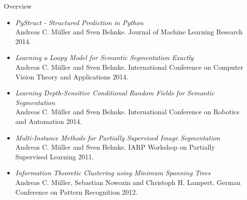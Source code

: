 \documentclass[final,ignorenonframetext,compress]{beamer}
\begin{document}
\begin{frame}{Overview}
    \tiny
\begin{itemize}
    \item
        \emph{PyStruct - Structured Prediction in Python}\\
        Andreas C. M\"uller and Sven Behnke. Journal of Machine Learning
        Research 2014.
    \item
        \emph{Learning a Loopy Model for Semantic Segmentation Exactly}\\
        Andreas C. M\"uller and Sven Behnke. International
        Conference on Computer Vision Theory and Applications 2014.
    \item
        \emph{Learning Depth-Sensitive Conditional Random Fields for Semantic Segmentation}\\
        Andreas C. M\"uller and Sven Behnke. International
        Conference on Robotics and Automation 2014.
    \item
        \emph{Multi-Instance Methods for Partially Supervised Image
        Segmentation}\\
        Andreas C. M\"uller and Sven Behnke. IARP Workshop on Partially Supervised Learning 2011.
    \item
        \emph{Information Theoretic Clustering using Minimum Spanning Trees}\\
        Andreas C. M\"uller, Sebastian Nowozin and Christoph H. Lampert.
        German Conference on Pattern Recognition 2012.
\end{itemize}
\end{frame}

\end{document}
